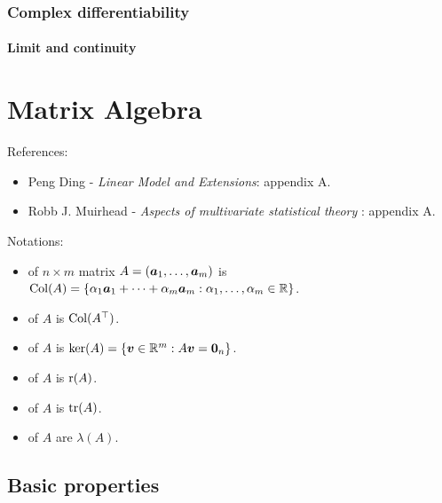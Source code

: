 \documentclass[10pt,a4paper]{book}
\begin{document}
\subsection{Complex differentiability}\label{sec:complex-diff}
\subsubsection{Limit and continuity}

\chapter{Matrix Algebra}\label{chap:mat}
References: 
\begin{itemize}
	\item Peng Ding - \textit{Linear Model and Extensions}: appendix A.
	\item Robb J. Muirhead - \textit{Aspects of multivariate statistical theory} \cite{muirhead1982aspects}: appendix A.
\end{itemize}

\noindent Notations:  
\begin{itemize}
	\item {} of $n\times m$ matrix $A=({\boldsymbol a}_1,\ldots,{\boldsymbol a}_m)$ is $\mathrm{Col}(A)=\{\alpha_{1}{\boldsymbol a}_{1}+\cdots+\alpha_{m}{\boldsymbol a}_{m}:\alpha_{1},\ldots,\alpha_{m}\in\mathbb R\}$.
	\item {} of $A$ is $\mathrm{Col}(A^\top)$.
	\item {} of $A$ is $\ker(A)=\{{\boldsymbol v}\in\mathbb R^{m}:A{\boldsymbol v}={\boldsymbol 0}_n\}$.  
	\item {} of $A$ is $\mathrm{r}(A)$.  
	\item {} of $A$ is $\mathrm{tr}(A)$.  
	\item {} of $A$ are $\lambda(A)$.  
\end{itemize}

\section{Basic properties}\label{sec:mat_basic}
\end{document}
